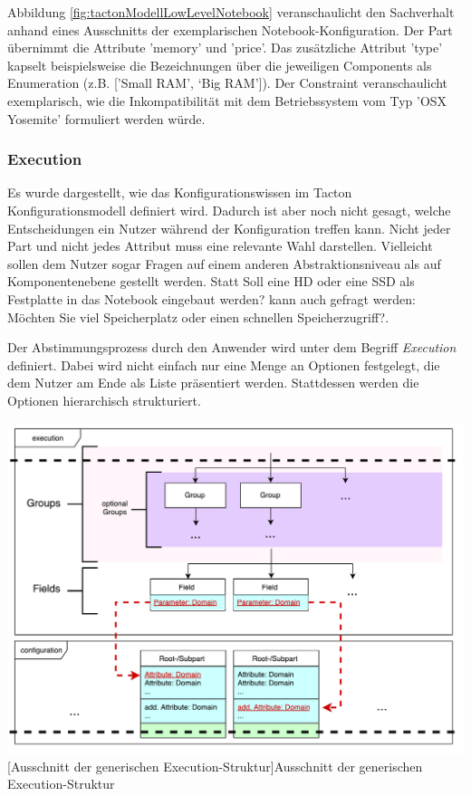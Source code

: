 \documentclass[11pt, a4paper, titlepage, listof=totoc, bibliography=totoc, index=totoc, twoside, openright, headings=normal]{scrreprt}
\begin{document}
Abbildung \ref{fig:tactonModellLowLevelNotebook} veranschaulicht den Sachverhalt anhand eines Ausschnitts der exemplarischen Notebook-Konfiguration.  Der Part übernimmt die Attribute 'memory' und 'price'. Das zusätzliche Attribut 'type' kapselt beispielsweise die Bezeichnungen über die jeweiligen Components als Enumeration (z.B. ['Small RAM', ‘Big RAM']). Der Constraint veranschaulicht exemplarisch, wie die Inkompatibilität mit dem Betriebssystem vom Typ 'OSX Yosemite' formuliert werden würde.

\subsubsection{Execution}
\label{Execution}
Es wurde dargestellt, wie das Konfigurationswissen im Tacton Konfigurationsmodell definiert wird. Dadurch ist aber noch nicht gesagt, welche Entscheidungen ein Nutzer während der Konfiguration treffen kann. Nicht jeder Part und nicht jedes Attribut muss eine relevante Wahl darstellen. Vielleicht sollen dem Nutzer sogar Fragen auf einem anderen Abstraktionsniveau als auf Komponentenebene gestellt werden. Statt \glqq Soll eine HD oder eine SSD als Festplatte in das Notebook eingebaut werden?\grqq{} kann auch gefragt werden: \glqq Möchten Sie viel Speicherplatz oder einen schnellen Speicherzugriff?\grqq.

Der Abstimmungsprozess durch den Anwender wird unter dem Begriff \emph{Execution} definiert. Dabei wird nicht einfach nur eine Menge an Optionen festgelegt, die dem Nutzer am Ende als Liste präsentiert werden. Stattdessen werden die Optionen hierarchisch strukturiert.

\vspace{1em}
\begin{minipage}{\linewidth}
	\centering
	\includegraphics[width=0.8\linewidth]{Abbildungen/tactonModellExecutionShort.pdf}
	[Ausschnitt der generischen Execution-Struktur]{Ausschnitt der generischen Execution-Struktur}
	\label{fig:tactonModellExecution}
\end{minipage}
\vspace{0.3em}
\end{document}
